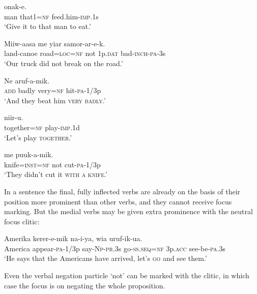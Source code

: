\ea%
\label{ex:x1723}
\gll {}   onak-e. \\
man  that1=\textsc{nf}  feed.him-\textsc{imp}.1s      \\
\glt`Give it to that man to eat.'
\z


\ea%
\label{ex:x1724}
\gll Miiw-aasa    me  yiar  samor-ar-e-k. \\
land-canoe  road=\textsc{loc}=\textsc{nf}  not  1p.\textsc{dat}  bad-\textsc{inch}-\textsc{pa}-3s      \\
\glt`Our truck did not break on the road.'
\z


\ea%
\label{ex:x1730}
\gll Ne    aruf-a-mik.\\
\textsc{add}  badly  very=\textsc{nf}  hit-\textsc{pa}-1/3p\\
\glt`And they beat him \textsc{very badly}.'
\z


\ea%
\label{ex:x1725}
\gll {}  niir-u. \\
together=\textsc{nf}  play-\textsc{imp}.1d      \\
\glt`Let's play \textsc{together}.'
\z


\ea%
\label{ex:x1726}
\gll {}  me  puuk-a-mik. \\
knife=\textsc{inst}=\textsc{nf}  not  cut-\textsc{pa}-1/3p      \\
\glt`They didn't cut it \textsc{with a knife}.'
\z


In a sentence the final, fully inflected verbs are already on the basis of their position more prominent than other verbs, and they cannot receive focus marking. But the medial verbs may be given extra prominence with the neutral focus clitic:

\ea%
\label{ex:x1727}
\gll Amerika  kerer-e-mik  na-i-ya,   wia  uruf-ik-ua.\\
America  appear-\textsc{pa}-1/3p  say-\textsc{Np}-\textsc{pr}.3s  go-\textsc{ss}.\textsc{seq}=\textsc{nf} 3p.\textsc{acc}  see-be-\textsc{pa}.3s     \\
\glt`He says that the Americans have arrived, let's \textsc{go} and see them.'
\z


Even the verbal negation particle  `not' can be marked with the  clitic, in which case the focus is on negating the whole proposition.

